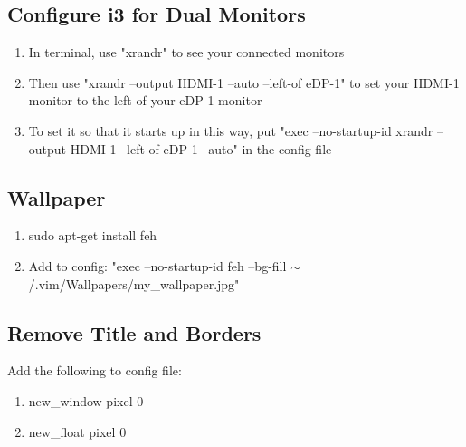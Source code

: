 \subsection{Configure i3 for Dual Monitors}
\begin{enumerate}
    \item In terminal, use "xrandr" to see your connected monitors
    \item Then use "xrandr --output HDMI-1 --auto --left-of eDP-1" to set your HDMI-1 monitor to
        the left of your eDP-1 monitor
    \item To set it so that it starts up in this way, put "exec --no-startup-id xrandr --output
        HDMI-1 --left-of eDP-1 --auto" in the config file
\end{enumerate}

\subsection{Wallpaper}
\begin{enumerate}
    \item sudo apt-get install feh
    \item Add to config: "exec --no-startup-id feh --bg-fill
        $\sim$/.vim/Wallpapers/my\_wallpaper.jpg"
\end{enumerate}

\subsection{Remove Title and Borders}
Add the following to config file:
\begin{enumerate}
    \item new\_window pixel 0
    \item new\_float pixel 0
\end{enumerate}

